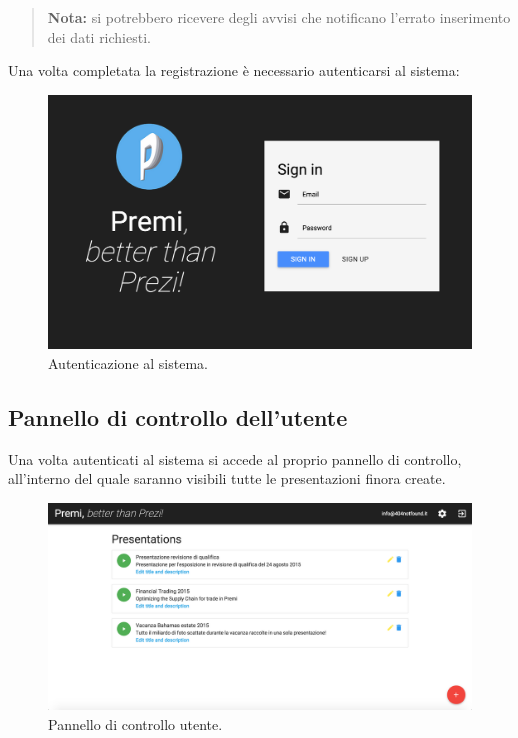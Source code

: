 \begin{quote}
\textbf{Nota:} si potrebbero ricevere degli avvisi che notificano l'errato inserimento dei dati richiesti.
\end{quote}

\newpage
Una volta completata la registrazione è necessario autenticarsi al sistema:
\begin{figure}[!h]
\begin{center}
\includegraphics[scale=0.4]{img/signin.png}
\caption{Autenticazione al sistema.}
\end{center}
\end{figure}

\newpage
\subsection{Pannello di controllo dell'utente}
Una volta autenticati al sistema si accede al proprio pannello di controllo, all'interno del quale saranno visibili tutte le presentazioni finora create.
\begin{figure}[h]
\begin{center}
\includegraphics[scale=0.35]{img/dashboard.png}
\caption{Pannello di controllo utente.}
\end{center}
\end{figure}

